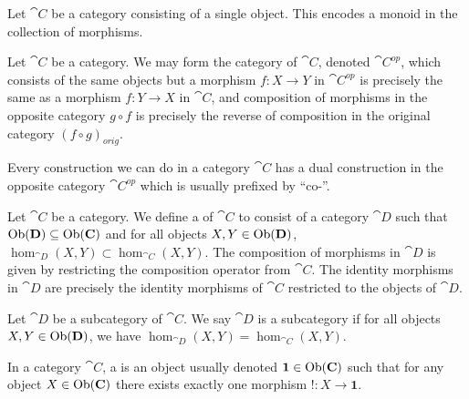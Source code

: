 \begin{node}[Category]
\begin{node}[Examples]
\begin{node}\label{cat-000M}%
Let $\cat{C}$ be a category consisting of a single object. This encodes
a monoid in the collection of morphisms.
\end{node}
\end{node} %

\begin{definition}\label{cat-000O}%
Let $\cat{C}$ be a category. We may form the  category
of $\cat{C}$, denoted $\cat{C}^{op}$, which consists of the same objects
but a morphism $f\colon X\to Y$ in $\cat{C}^{op}$ is precisely the same
as a morphism $f\colon Y\to X$ in $\cat{C}$, and composition of
morphisms in the opposite category $g\circ f$ is precisely the reverse
of composition in the original category $(f\circ g)_{orig}$.

\begin{node}\label{cat-000P}%
Every construction we can do in a category $\cat{C}$ has a dual
construction in the opposite category $\cat{C}^{op}$ which is usually
prefixed by ``co-''.
\end{node}
\end{definition}

\begin{definition}\label{cat-000G}%
Let $\cat{C}$ be a category. We define a  of $\cat{C}$
to consist of a category $\cat{D}$ such that $\operatorname{Ob}(\mathbf{D})\subseteq\operatorname{Ob}(\mathbf{C})$
and for all objects $X,Y\in\operatorname{Ob}(\mathbf{D})$,
$\hom_{\cat{D}}(X,Y)\subset\hom_{\cat{C}}(X,Y)$. The composition of
morphisms in $\cat{D}$ is given by restricting the composition operator
from $\cat{C}$. The identity morphisms in $\cat{D}$ are precisely the
identity morphisms of $\cat{C}$ restricted to the objects of $\cat{D}$.

\begin{definition}\label{cat-000H}%
Let $\cat{D}$ be a subcategory of $\cat{C}$. We say $\cat{D}$ is a
 subcategory if for all objects $X,Y\in\operatorname{Ob}(\mathbf{D})$, we
have $\hom_{\cat{D}}(X,Y)=\hom_{\cat{C}}(X,Y)$.
\end{definition}
\end{definition}

\begin{node}\label{cat-0012}%

\begin{definition}\label{cat-0013}%
In a category $\cat{C}$, a  is an object usually
denoted $\mathbf{1}\in\operatorname{Ob}(\mathbf{C})$ such that for any object
$X\in\operatorname{Ob}(\mathbf{C})$ there exists exactly one morphism $!\colon X\to\mathbf{1}$.
\end{definition}


\end{node}
\end{node}
